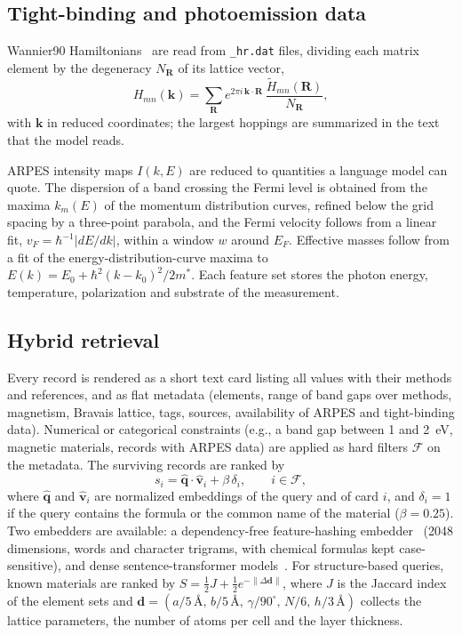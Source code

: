 \documentclass[prmaterials,twocolumn,superscriptaddress,longbibliography,nofootinbib]{revtex4-2}
\newcommand{\code}[1]{\texttt{#1}}
\newcommand{\kvec}{\mathbf{k}}
\newcommand{\Rvec}{\mathbf{R}}
\begin{document}
\subsection{Tight-binding and photoemission data}

Wannier90 Hamiltonians~\cite{Marzari2012,Pizzi2020} are read from \code{\_hr.dat} files,
dividing each matrix element by the degeneracy $N_{\Rvec}$ of its lattice vector,
\begin{equation}
  H_{mn}(\kvec) = \sum_{\Rvec} e^{2\pi i\,\kvec\cdot\Rvec}\,
  \frac{\tilde H_{mn}(\Rvec)}{N_{\Rvec}},
\end{equation}
with $\kvec$ in reduced coordinates; the largest hoppings are summarized in the text that
the model reads.

ARPES intensity maps $I(k,E)$ are reduced to quantities a language model can quote. The
dispersion of a band crossing the Fermi level is obtained from the maxima $k_m(E)$ of the
momentum distribution curves, refined below the grid spacing by a three-point parabola, and
the Fermi velocity follows from a linear fit, $v_F=\hbar^{-1}|dE/dk|$, within a window $w$
around $E_F$. Effective masses follow from a fit of the energy-distribution-curve maxima to
$E(k)=E_0+\hbar^2(k-k_0)^2/2m^*$. Each feature set stores the photon energy, temperature,
polarization and substrate of the measurement.

\subsection{Hybrid retrieval}

Every record is rendered as a short text card listing all values with their methods and
references, and as flat metadata (elements, range of band gaps over methods, magnetism,
Bravais lattice, tags, sources, availability of ARPES and tight-binding data). Numerical
or categorical constraints (e.g., a band gap between 1 and 2~eV, magnetic materials, records
with ARPES data) are applied as hard filters $\mathcal F$ on the metadata. The surviving
records are ranked by
\begin{equation}
  s_i = \hat{\mathbf q}\cdot\hat{\mathbf v}_i + \beta\,\delta_i, \qquad i\in\mathcal F,
\end{equation}
where $\hat{\mathbf q}$ and $\hat{\mathbf v}_i$ are normalized embeddings of the query and
of card $i$, and $\delta_i=1$ if the query contains the formula or the common name of the
material ($\beta=0.25$). Two embedders are available: a dependency-free feature-hashing
embedder~\cite{Weinberger2009} (2048 dimensions, words and character trigrams, with
chemical formulas kept case-sensitive), and dense sentence-transformer
models~\cite{Reimers2019}. For structure-based queries, known materials are ranked by
$S=\tfrac12 J+\tfrac12 e^{-\lVert\Delta\mathbf d\rVert}$, where $J$ is the Jaccard index of
the element sets and $\mathbf d=(a/5\,\text{\AA},\,b/5\,\text{\AA},\,\gamma/90^\circ,\,
N/6,\,h/3\,\text{\AA})$ collects the lattice parameters, the number of atoms per cell and the
layer thickness.
\end{document}
